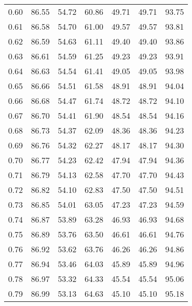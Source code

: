 \begin{tabular}{|c|c|c|c|c|c|c|}
      0.60 &     86.55 &     54.72 &      60.86 &   49.71 &      49.71 &         93.75 \\
      0.61 &     86.58 &     54.70 &      61.00 &   49.57 &      49.57 &         93.81 \\
      0.62 &     86.59 &     54.63 &      61.11 &   49.40 &      49.40 &         93.86 \\
      0.63 &     86.61 &     54.59 &      61.25 &   49.23 &      49.23 &         93.91 \\
      0.64 &     86.63 &     54.54 &      61.41 &   49.05 &      49.05 &         93.98 \\
      0.65 &     86.66 &     54.51 &      61.58 &   48.91 &      48.91 &         94.04 \\
      0.66 &     86.68 &     54.47 &      61.74 &   48.72 &      48.72 &         94.10 \\
      0.67 &     86.70 &     54.41 &      61.90 &   48.54 &      48.54 &         94.16 \\
      0.68 &     86.73 &     54.37 &      62.09 &   48.36 &      48.36 &         94.23 \\
      0.69 &     86.76 &     54.32 &      62.27 &   48.17 &      48.17 &         94.30 \\
      0.70 &     86.77 &     54.23 &      62.42 &   47.94 &      47.94 &         94.36 \\
      0.71 &     86.79 &     54.13 &      62.58 &   47.70 &      47.70 &         94.43 \\
      0.72 &     86.82 &     54.10 &      62.83 &   47.50 &      47.50 &         94.51 \\
      0.73 &     86.85 &     54.01 &      63.05 &   47.23 &      47.23 &         94.59 \\
      0.74 &     86.87 &     53.89 &      63.28 &   46.93 &      46.93 &         94.68 \\
      0.75 &     86.89 &     53.76 &      63.50 &   46.61 &      46.61 &         94.76 \\
      0.76 &     86.92 &     53.62 &      63.76 &   46.26 &      46.26 &         94.86 \\
      0.77 &     86.94 &     53.46 &      64.03 &   45.89 &      45.89 &         94.96 \\
      0.78 &     86.97 &     53.32 &      64.33 &   45.54 &      45.54 &         95.06 \\
      0.79 &     86.99 &     53.13 &      64.63 &   45.10 &      45.10 &         95.18 \\

\end{tabular}
